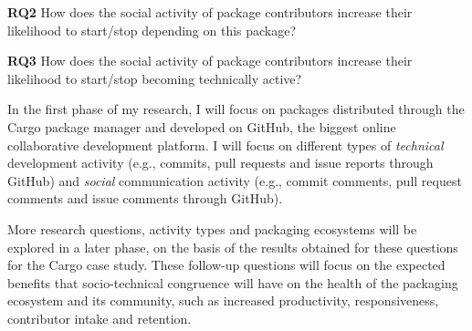 \noindent
 \textbf{RQ2} How does the social activity of package contributors increase their likelihood to start/stop depending on this package?

\noindent
\textbf{RQ3} How does the social activity of package contributors increase their likelihood to start/stop becoming technically active?


In the first phase of my research, I will focus on packages distributed through the Cargo package manager and developed on GitHub, the biggest online collaborative development platform.
%
I will focus on different types of \emph{technical} development activity (e.g., commits, pull requests and issue reports through GitHub) and \emph{social} communication activity (e.g., commit comments, pull request comments and issue comments through GitHub). 

More research questions, activity types and packaging ecosystems will be explored in a later phase, on the basis of the results obtained for these questions for the Cargo case study. These follow-up questions will focus on the expected benefits that socio-technical congruence will have on the health of the packaging ecosystem and its community, such as increased productivity, responsiveness, contributor intake and retention.